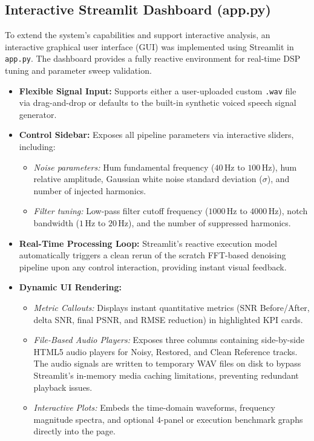 \documentclass[11pt]{article}
\begin{document}
\subsection{Interactive Streamlit Dashboard (app.py)}

To extend the system's capabilities and support interactive analysis, an interactive graphical user interface (GUI) was implemented using Streamlit in \texttt{app.py}. The dashboard provides a fully reactive environment for real-time DSP tuning and parameter sweep validation.

\begin{itemize}[noitemsep,topsep=0pt]
    \item \textbf{Flexible Signal Input:} Supports either a user-uploaded custom \texttt{.wav} file via drag-and-drop or defaults to the built-in synthetic voiced speech signal generator.
    \item \textbf{Control Sidebar:} Exposes all pipeline parameters via interactive sliders, including:
    \begin{itemize}[noitemsep,topsep=0pt]
        \item \textit{Noise parameters:} Hum fundamental frequency ($40\,\text{Hz}$ to $100\,\text{Hz}$), hum relative amplitude, Gaussian white noise standard deviation ($\sigma$), and number of injected harmonics.
        \item \textit{Filter tuning:} Low-pass filter cutoff frequency ($1000\,\text{Hz}$ to $4000\,\text{Hz}$), notch bandwidth ($1\,\text{Hz}$ to $20\,\text{Hz}$), and the number of suppressed harmonics.
    \end{itemize}
    \item \textbf{Real-Time Processing Loop:} Streamlit's reactive execution model automatically triggers a clean rerun of the scratch FFT-based denoising pipeline upon any control interaction, providing instant visual feedback.
    \item \textbf{Dynamic UI Rendering:} 
    \begin{itemize}[noitemsep,topsep=0pt]
        \item \textit{Metric Callouts:} Displays instant quantitative metrics (SNR Before/After, delta SNR, final PSNR, and RMSE reduction) in highlighted KPI cards.
        \item \textit{File-Based Audio Players:} Exposes three columns containing side-by-side HTML5 audio players for Noisy, Restored, and Clean Reference tracks. The audio signals are written to temporary WAV files on disk to bypass Streamlit's in-memory media caching limitations, preventing redundant playback issues.
        \item \textit{Interactive Plots:} Embeds the time-domain waveforms, frequency magnitude spectra, and optional 4-panel or execution benchmark graphs directly into the page.
    \end{itemize}
\end{itemize}
\end{document}
